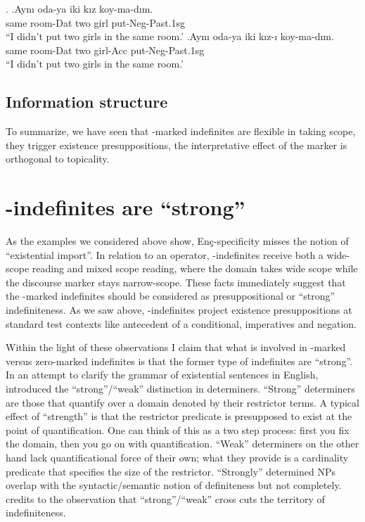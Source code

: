 \documentclass[11pt,a4paper]{article}
\newcommand{\encspec}{Enç-specific}
\begin{document}
\ex.
\ag.\label{odaz}Aynı oda-ya iki kız koy-ma-dım.\\
same room-Dat  two girl put-Neg-Past.1sg\\
``I didn't put two girls in the same room.'
\bg.\label{odaa}Aynı oda-ya iki kız-ı koy-ma-dım.\\
same room-Dat  two girl-Acc put-Neg-Past.1sg\\
``I didn't put two girls in the same room.'


\subsection{Information structure}

To summarize, we have seen that \acc-marked indefinites are flexible in taking scope, they trigger existence presuppositions, the interpretative effect of the marker is orthogonal to topicality.


\section{\acc-indefinites are ``strong''}
\label{scstrong}

As the examples we considered above show, \encspec ity misses the notion of
``existential import''.  In relation to an operator, \acc-indefinites receive
both a wide-scope reading and mixed scope reading, where the domain takes wide
scope while the discourse marker stays narrow-scope.  These facts immediately
suggest that the \acc-marked indefinites should be considered as
presuppositional or ``strong'' indefiniteness.  As we saw above,
\acc-indefinites project existence presuppositions at standard test contexts
like antecedent of a conditional, imperatives and negation. 

Within the light of these observations I claim that what is involved in
\acc-marked versus zero-marked indefinites is that the former type of
indefinites are ``strong''.  In an attempt to clarify the grammar of
existential sentences in English, \cite{milsark77} introduced the
``strong''/``weak'' distinction in determiners. ``Strong'' determiners are
those that quantify over a domain denoted by their restrictor terms. A typical
effect of ``strength'' is that the restrictor predicate is presupposed to exist
at the point of quantification. One can think of this as a two step process:
first you fix the domain, then you go on with quantification. ``Weak''
determiners on the other hand lack quantificational force of their own; what
they provide is a cardinality predicate that specifies the size of the
restrictor. ``Strongly'' determined NPs overlap with the syntactic/semantic
notion of definiteness but not completely.  credits to
 the observation that ``strong''/``weak'' cross cuts the
territory of indefiniteness. 
\end{document}
